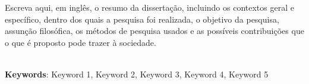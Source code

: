 \begin{thesisabastract}
Escreva aqui, em ingl\^es, o resumo da disserta\c{c}\~ao, incluindo os contextos geral e espec\'ifico, dentro dos quais a pesquisa foi realizada, o objetivo da pesquisa, assun\c{c}\~ao filos\'ofica, os m\'etodos de pesquisa usados e as poss\'iveis contribui\c{c}\~oes que o que \'e proposto pode trazer \`a sociedade. 

\ \\


\textbf{Keywords}: Keyword 1, Keyword 2, Keyword 3, Keyword 4, Keyword 5

\end{thesisabastract}
